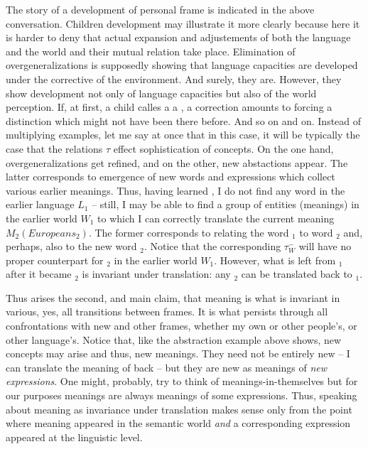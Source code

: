 \documentclass[10pt]{article}
\begin{document}
The story of a development of personal frame is indicated in the above 
conversation. Children development may illustrate it more 
clearly because here it is harder to deny that actual expansion 
and adjustements of both the language and the world and their mutual 
relation take place. Elimination of overgeneralizations is supposedly 
showing that language capacities are developed under the corrective of the 
environment. And surely, they are. However, they show development not only 
of language capacities but also of the world perception.
 If, at first, a child calles a 
 a , a correction amounts to forcing a distinction which 
might not have been there before. And so on and on. Instead of multiplying 
examples, let me say at once that in this case, it will be typically the 
case that the relations $\tau$ effect sophistication of concepts. On the 
one hand, overgeneralizations get refined, and on the other, new 
abstactions appear. The latter corresponds to emergence of new words and 
expressions which collect various earlier meanings. Thus, having learned 
, I do not find any word in the earlier language $L_1$ -- 
still, I may be able to find a group of entities (meanings) in the earlier 
world $W_1$ to which I can correctly translate the current meaning 
$M_2(Europeans_2)$.
The former corresponds to relating the word 
$_1$ to word $_2$ and, perhaps, also to the new word 
$_2$. Notice that the corresponding $\tau^-_W$ will have no 
proper counterpart for $_2$ in the earlier world $W_1$.
However, what is left from $_1$ after it became $_2$ is 
invariant under translation: any $_2$ can be translated back to 
$_1$.

Thus arises the second, and main claim, that meaning is what is invariant 
in various, yes, all transitions between frames. It is what persists
through all confrontations with new and other frames, whether my own or 
other people's, or other language's. Notice that, like the abstraction 
example above shows, new concepts may arise and thus, new meanings. They 
need not be entirely new -- I can translate the meaning of  
back -- but they are new as meanings of {\em new expressions}. 
One might, probably, try to think of meanings-in-themselves but for our 
purposes meanings are always meanings of some expressions. Thus, 
speaking about meaning as invariance under translation makes sense only from the 
point where meaning appeared in the semantic world {\em and} a 
corresponding expression appeared at the linguistic level.
\end{document}
